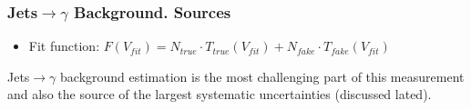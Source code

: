 \begin{frame}\frametitle{Jets$\rightarrow \gamma$ Background. Sources}
  \scriptsize
  \begin{itemize}
    \item Fit function: $F(V_{fit})=N_{true} \cdot T_{true}(V_{fit}) + N_{fake} \cdot T_{fake}(V_{fit})$
  \end{itemize}
  \tiny
  Jets$\rightarrow \gamma$ background estimation is the most challenging part of this measurement and also the source of the largest systematic uncertainties (discussed lated).
\end{frame}

